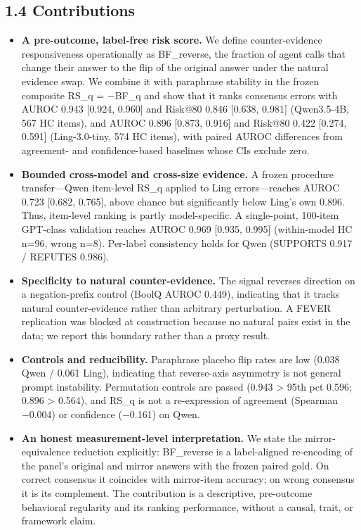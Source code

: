 \documentclass[11pt]{article}
\begin{document}
\subsection{1.4 Contributions}

\begin{itemize}
  \item \textbf{A pre-outcome, label-free risk score.} We define counter-evidence responsiveness operationally as BF\_reverse, the fraction of agent calls that change their answer to the flip of the original answer under the natural evidence swap. We combine it with paraphrase stability in the frozen composite RS\_q = −BF\_q and show that it ranks consensus errors with AUROC 0.943 [0.924, 0.960] and Risk@80 0.846 [0.638, 0.981] (Qwen3.5-4B, 567 HC items), and AUROC 0.896 [0.873, 0.916] and Risk@80 0.422 [0.274, 0.591] (Ling-3.0-tiny, 574 HC items), with paired AUROC differences from agreement- and confidence-based baselines whose CIs exclude zero.
  \item \textbf{Bounded cross-model and cross-size evidence.} A frozen procedure transfer—Qwen item-level RS\_q applied to Ling errors—reaches AUROC 0.723 [0.682, 0.765], above chance but significantly below Ling's own 0.896. Thus, item-level ranking is partly model-specific. A single-point, 100-item GPT-class validation reaches AUROC 0.969 [0.935, 0.995] (within-model HC n=96, wrong n=8). Per-label consistency holds for Qwen (SUPPORTS 0.917 / REFUTES 0.986).
  \item \textbf{Specificity to natural counter-evidence.} The signal reverses direction on a negation-prefix control (BoolQ AUROC 0.449), indicating that it tracks natural counter-evidence rather than arbitrary perturbation. A FEVER replication was blocked at construction because no natural pairs exist in the data; we report this boundary rather than a proxy result.
  \item \textbf{Controls and reducibility.} Paraphrase placebo flip rates are low (0.038 Qwen / 0.061 Ling), indicating that reverse-axis asymmetry is not general prompt instability. Permutation controls are passed (0.943 > 95th pct 0.596; 0.896 > 0.564), and RS\_q is not a re-expression of agreement (Spearman −0.004) or confidence (−0.161) on Qwen.
  \item \textbf{An honest measurement-level interpretation.} We state the mirror-equivalence reduction explicitly: BF\_reverse is a label-aligned re-encoding of the panel's original and mirror answers with the frozen paired gold. On correct consensus it coincides with mirror-item accuracy; on wrong consensus it is its complement. The contribution is a descriptive, pre-outcome behavioral regularity and its ranking performance, without a causal, trait, or framework claim.
\end{itemize}
\end{document}
